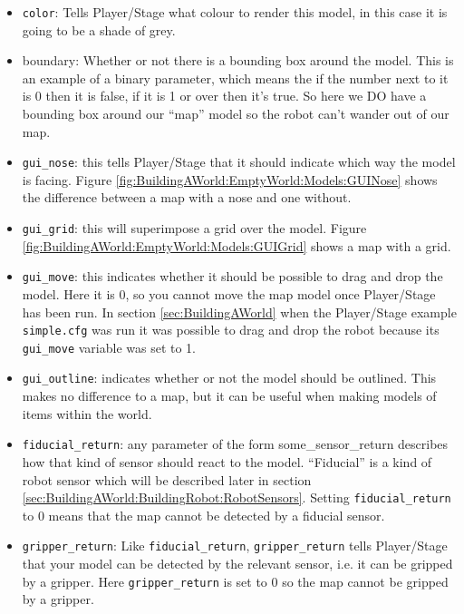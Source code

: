 \documentclass[a4paper]{report}
\newcommand{\plst}{Player/Stage\xspace}
\begin{document}
\begin{itemize}
\item \verb|color|: Tells \plst what colour to render this model, in this case it is going to be a shade of grey. 
\item boundary: Whether or not there is a bounding box around the model. This is an example of a binary parameter, which means the if the number next to it is 0 then it is false, if it is 1 or over then it's true. So here we DO have a bounding box around our ``map'' model so the robot can't wander out of our map.
\item \verb|gui_nose|: this tells \plst that it should indicate which way the model is facing. Figure \ref{fig:BuildingAWorld:EmptyWorld:Models:GUINose} shows the difference between a map with a nose and one without.
\item \verb|gui_grid|: this will superimpose a grid over the model. Figure \ref{fig:BuildingAWorld:EmptyWorld:Models:GUIGrid} shows a map with a grid.
\item \verb|gui_move|: this indicates whether it should be possible to drag and drop the model. Here it is 0, so you cannot move the map model once \plst has been run. In section \ref{sec:BuildingAWorld} when the \plst example \verb|simple.cfg| was run it was possible to drag and drop the robot because its \verb|gui_move| variable was set to 1.
\item \verb|gui_outline|: indicates whether or not the model should be outlined. This makes no difference to a map, but it can be useful when making models of items within the world.


\item \verb|fiducial_return|: any parameter of the form some\_sensor\_return describes how that kind of sensor should react to the model. ``Fiducial'' is a kind of robot sensor which will be described later in section \ref{sec:BuildingAWorld:BuildingRobot:RobotSensors}. Setting \verb|fiducial_return| to 0 means that the map cannot be detected by a fiducial sensor.
\item \verb|gripper_return|: Like \verb|fiducial_return|, \verb|gripper_return| tells \plst that your model can be detected by the relevant sensor, i.e. it can be gripped by a gripper. Here \verb|gripper_return| is set to 0 so the map cannot be gripped by a gripper. 
\end{itemize}
\end{document}
